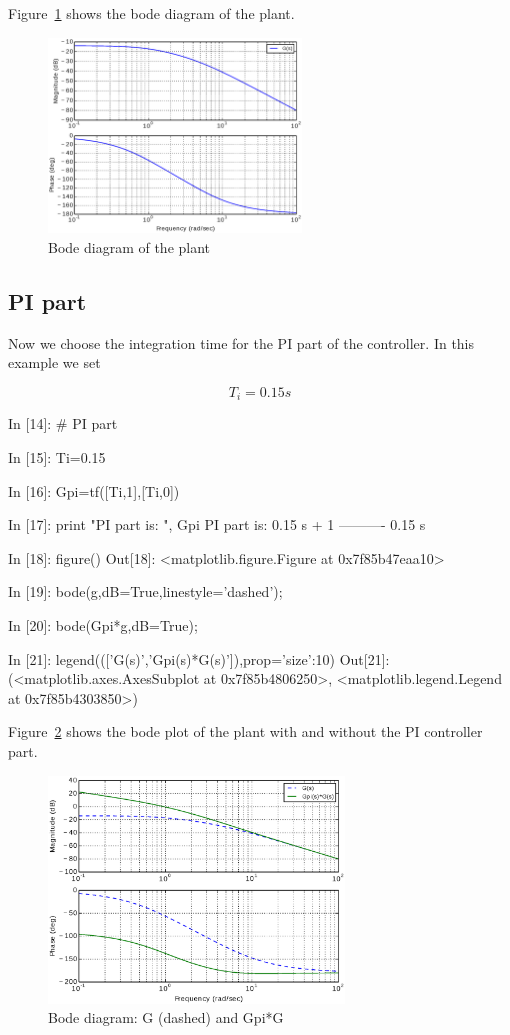 Figure~\ref{F10} shows the bode diagram of the plant.

\begin{figure}[htbp]	%
\centering
\includegraphics[width=0.6\textwidth]{eps/bodeplant.eps}
\caption{Bode diagram of the plant}
\label{F10}
\end{figure}

\subsection{PI part}

Now we choose the integration time for the PI part of the controller. In this 
example we set

$$
T_i=0.15s
$$

\begin{code}
In [14]: # PI part

In [15]: Ti=0.15

In [16]: Gpi=tf([Ti,1],[Ti,0])

In [17]: print "PI part is: ", Gpi
PI part is:  
0.15 s + 1
----------
  0.15 s


In [18]: figure()
Out[18]: <matplotlib.figure.Figure at 0x7f85b47eaa10>

In [19]: bode(g,dB=True,linestyle='dashed');

In [20]: bode(Gpi*g,dB=True);

In [21]: legend((['G(s)','Gpi(s)*G(s)']),prop={'size':10})
Out[21]: 
(<matplotlib.axes.AxesSubplot at 0x7f85b4806250>,
 <matplotlib.legend.Legend at 0x7f85b4303850>)
\end{code}

Figure~\ref{F11} shows the bode plot of the plant with and without the PI 
controller part.

\begin{figure}[htbp]	%
\centering
\includegraphics[width=0.7\textwidth]{eps/bodeplantpi.eps}
\caption{Bode diagram: G (dashed) and Gpi*G}
\label{F11}
\end{figure}

